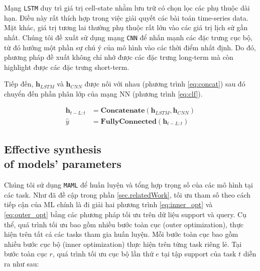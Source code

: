 \documentclass[aps,prb,groupedaddress,twocolumn,showpacs,dvipdfmx,superscriptaddress,pdftex]{revtex4-2}
\begin{document}
\vspace{2mm}

Mạng \verb|LSTM| duy trì giá trị cell-state nhằm lưu trữ có chọn lọc các phụ thuộc dài hạn. Điều này rất thích hợp trong việc giải quyết các bài toán time-series data. Mặt khác, giá trị tương lai thường phụ thuộc rất lớn vào các giá trị lịch sử gần nhất. Chúng tôi đề xuất sử dụng mạng \verb|CNN| để nhấn mạnh các đặc trưng cục bộ, từ đó hướng một phần sự chú ý của mô hình vào các thời điểm nhất định. Do đó, phương pháp đề xuất không chỉ nhớ được các đặc trưng long-term mà còn highlight được các đặc trưng short-term.


\vspace{2mm}

Tiếp đến, $\mathbf{h}_{LSTM}$ và $\mathbf{h}_{CNN}$ được nối với nhau (phương trình \ref{eq:concat}) sau đó chuyển đến phần phân lớp của mạng NN (phương trình \ref{eq:clf}).


\begin{align}
    \mathbf{h}_{t-L:t} &= \mathbf{Concatenate}\left( \mathbf{h}_{LSTM}, \mathbf{h}_{CNN} \right) \label{eq:concat} \\
    \hat y &= \mathbf{FullyConnected}\left( \mathbf{h}_{t-L:t} \right) \label{eq:clf}
\end{align}

\subsection{Effective synthesis\\of models' parameters}

Chúng tôi sử dụng \verb|MAML| để huấn luyện và tổng hợp trọng số của các mô hình tại các task. Như đã đề cập trong phần \ref{sec.relatedWork}, tối ưu tham số theo cách tiếp cận của ML chính là đi giải hai phương trình \ref{eq:inner_opt} và \ref{eq:outer_opt} bằng các phương pháp tối ưu trên dữ liệu support và query. Cụ thể, quá trình tối ưu bao gồm nhiều bước toàn cục (outer optimization), thực hiện trên tất cả các tasks tham gia huấn luyện. Mỗi bước toàn cục bao gồm nhiều bước cục bộ (inner optimization) thực hiện trên từng task riêng lẻ. Tại bước toàn cục $r$, quá trình tối ưu cục bộ lần thứ $e$ tại tập support của task $t$ diễn ra như sau:
\end{document}
